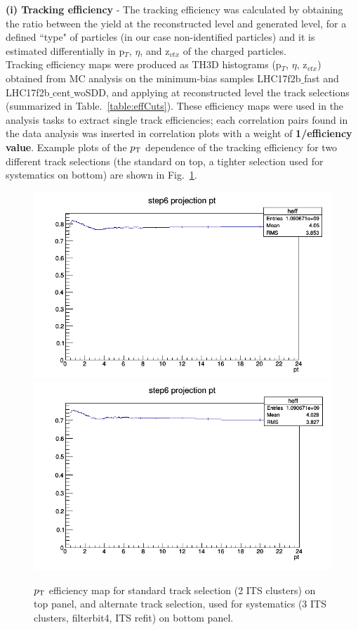 {\bf \normalsize (i) Tracking efficiency} - The tracking efficiency was calculated by obtaining the ratio between the yield at the reconstructed level and generated level, for a defined ``type" of particles (in our case non-identified particles) and it is estimated differentially in p$_T$, $\eta$, and z$_{vtx}$ of the charged particles.\\

Tracking efficiency maps were produced as TH3D histograms (p$_T$, $\eta$, z$_{vtx}$) obtained from MC analysis on the minimum-bias samples LHC17f2b$\_$fast and LHC17f2b$\_$cent$\_$woSDD, and applying at reconstructed level the track selections (summarized in Table.~\ref{table:effCuts}). These efficiency maps were used in the analysis tasks to extract single track efficiencies; each correlation pairs found in the data analysis was inserted in correlation plots with a weight of {\bf 1/efficiency value}.  Example plots of the $p_{\rm T}$ dependence of the tracking efficiency for two different track selections (the standard on top, a tighter selection used for systematics on bottom) are shown in Fig.~\ref{fig:trackeff}.

\begin{figure}[h]
	\centering
	\includegraphics[scale=0.7]{figures/Effs/TrackEfficiency_pPb2016_defaultCuts.png}
    \includegraphics[scale=0.7]{figures/Effs/TrackEfficiency_pPb2016_Min3ITSCls.png}
	\caption{$p_{\rm T}$ efficiency map for standard track selection (2 ITS clusters) on top panel, and alternate track selection, used for systematics (3 ITS clusters, filterbit4, ITS refit) on bottom panel.}
	\label{fig:trackeff}	
\end{figure}

